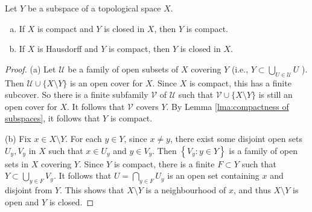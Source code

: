 \documentclass[a4paper,11pt]{article}
\begin{document}
\begin{proposition}\label{prop:compact close -> compact; Hausdorff compact -> closed}
    Let $Y$ be a subspace of a topological space $X$.
    \begin{enumerate}[(a)]
        \item If $X$ is compact and $Y$ is closed in $X$, then $Y$ is compact.
        \item If $X$ is Hausdorff and $Y$ is compact, then $Y$ is closed in $X$.
    \end{enumerate}
\end{proposition}
\begin{proof}
    (a) Let $\mathcal{U}$ be a family of open subsets of $X$ covering $Y$ (i.e., $Y \subset \bigcup_{U \in \mathcal{U}} U$ ). Then $\mathcal{U} \cup\{X \setminus Y\}$ is an open cover for $X$. Since $X$ is compact, this has a finite subcover. So there is a finite subfamily $\mathcal{V}$ of $\mathcal{U}$ such that $\mathcal{V} \cup\{X \setminus Y\}$ is still an open cover for $X$. It follows that $\mathcal{V}$ covers $Y$. By Lemma \ref{lma:compactness of subspaces}, it follows that $Y$ is compact.

(b) Fix $x \in X \setminus Y$. For each $y \in Y$, since $x \neq y$, there exist some disjoint open sets $U_{y}, V_{y}$ in $X$ such that $x \in U_{y}$ and $y \in V_{y}$. Then $\left\{V_{y}: y \in Y\right\}$ is a family of open sets in $X$ covering $Y$. Since $Y$ is compact, there is a finite $F \subset Y$ such that $Y \subset \bigcup_{y \in F} V_{y}$. It follows that $U=\bigcap_{y \in F} U_{y}$ is an open set containing $x$ and disjoint from $Y$. This shows that $X \setminus Y$ is a neighbourhood of $x$, and thus $X \setminus Y$ is open and $Y$ is closed.
\end{proof}
\end{document}
